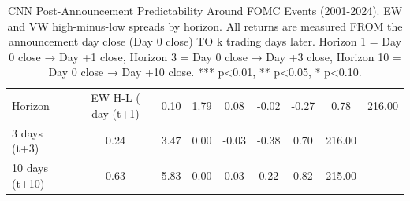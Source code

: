 \begin{table}[ht]
\centering
\caption{CNN Post-Announcement Predictability Around FOMC Events (2001-2024). EW and VW high-minus-low spreads by horizon. All returns are measured FROM the announcement day close (Day 0 close) TO k trading days later. Horizon 1 = Day 0 close → Day +1 close, Horizon 3 = Day 0 close → Day +3 close, Horizon 10 = Day 0 close → Day +10 close. *** p<0.01, ** p<0.05, * p<0.10.}
\label{tab:fomc_timeline}
\begin{tabular}{lccccccc}
\toprule
Horizon & EW H-L (%
 day (t+1) & 0.10 & 1.79 & 0.08 & -0.02 & -0.27 & 0.78 & 216.00 \\
3 days (t+3) & 0.24 & 3.47 & 0.00 & -0.03 & -0.38 & 0.70 & 216.00 \\
10 days (t+10) & 0.63 & 5.83 & 0.00 & 0.03 & 0.22 & 0.82 & 215.00 \\
\bottomrule
\end{tabular}
\end{table}

